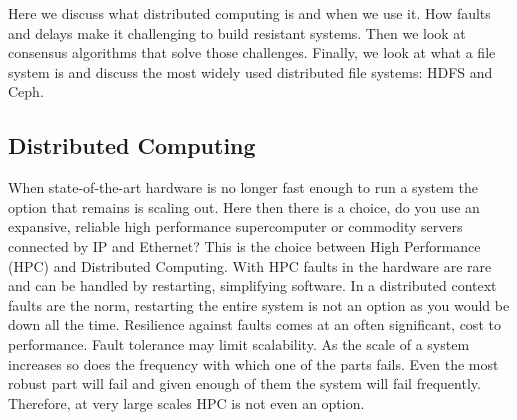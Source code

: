 Here we discuss what distributed computing is and when we use it. How faults and delays make it challenging to build resistant systems. Then we look at consensus algorithms that solve those challenges. Finally, we look at what a file system is and discuss the most widely used distributed file systems: HDFS and Ceph.

\subsection{Distributed Computing}
When state-of-the-art hardware is no longer fast enough to run a system the option that remains is scaling out. Here then there is a choice, do you use an expansive, reliable high performance supercomputer or commodity servers connected by IP and Ethernet? This is the choice between High Performance (HPC) and Distributed Computing. With HPC faults in the hardware are rare and can be handled by restarting, simplifying software. In a distributed context faults are the norm, restarting the entire system is not an option as you would be down all the time. Resilience against faults comes at an often significant, cost to performance. Fault tolerance may limit scalability. As the scale of a system increases so does the frequency with which one of the parts fails. Even the most robust part will fail and given enough of them the system will fail frequently. Therefore, at very large scales HPC is not even an option. 
